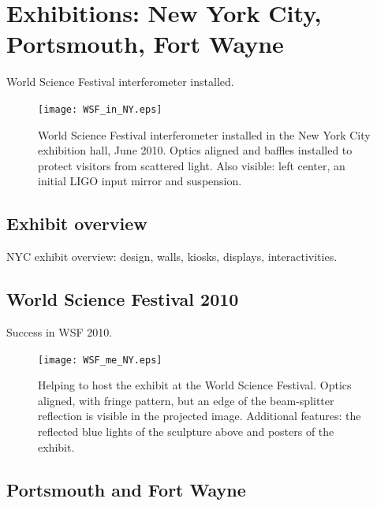 

    \section{Exhibitions: New York City, Portsmouth, Fort Wayne}
    \label{exhibitions}

        World Science Festival interferometer installed.

	\begin{figure}
	\begin{center}
	\texttt{[image: WSF\_in\_NY.eps]}
	\caption{World Science Festival interferometer installed in the New York City exhibition hall, June 2010. Optics aligned and baffles installed to protect visitors from scattered light. Also visible: left center, an initial LIGO input mirror and suspension.}
	\label{WSF_IFO_photo}
	\end{center}
	\end{figure}


        \subsection{Exhibit overview}
        \label{exhibit_overview}

            NYC exhibit overview: design, walls, kiosks, displays, interactivities.

        \subsection{World Science Festival 2010}
        \label{WSF2010}

            Success in WSF 2010.

	\begin{figure}
	\begin{center}
	\texttt{[image: WSF\_me\_NY.eps]}
	\caption{Helping to host the exhibit at the World Science Festival. Optics aligned, with fringe pattern, but an edge of the beam-splitter reflection is visible in the projected image. Additional features: the reflected blue lights of the sculpture above and posters of the exhibit.}
	\label{WSF_IFO_me}
	\end{center}
	\end{figure}


        \subsection{Portsmouth and Fort Wayne}
        \label{secondary_installations}

